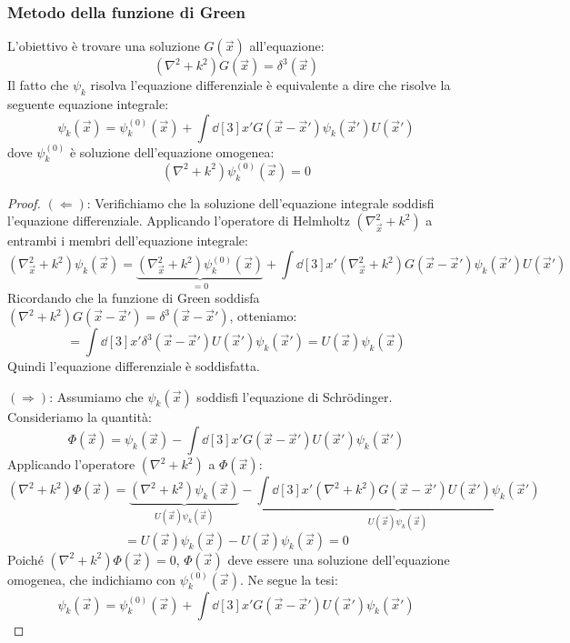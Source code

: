 \subsubsection{Metodo della funzione di Green}
L'obiettivo è trovare una soluzione \( G(\vec{x}) \) all'equazione:
\begin{equation}
    (\nabla^2 + k^2)G(\vec{x}) = \delta^3(\vec{x})
\end{equation}
Il fatto che \( \psi_k \) risolva l'equazione differenziale è equivalente a dire che risolve la seguente equazione integrale:
\begin{equation}
    \psi_k(\vec{x}) = \psi_k^{(0)}(\vec{x}) + \int \dd[3]{x'} G(\vec{x}-\vec{x}') \psi_k(\vec{x}') U(\vec{x}')
\end{equation}
dove \( \psi_k^{(0)} \) è soluzione dell'equazione omogenea:
\[
    (\nabla^2 + k^2) \psi_k^{(0)}(\vec{x}) = 0
\]
\begin{proof}
    $(\Leftarrow)$:
    Verifichiamo che la soluzione dell'equazione integrale soddisfi l'equazione differenziale. Applicando l'operatore di Helmholtz \( (\nabla_{\vec{x}}^2 + k^2) \) a entrambi i membri dell'equazione integrale:
    \[
        (\nabla_{\vec{x}}^2 + k^2) \psi_k(\vec{x}) = \underbrace{(\nabla_{\vec{x}}^2 + k^2) \psi_k^{(0)}(\vec{x})}_{=0} + \int \dd[3]{x'} (\nabla_{\vec{x}}^2 + k^2) G(\vec{x}-\vec{x}') \psi_k(\vec{x}') U(\vec{x}')
    \]
    Ricordando che la funzione di Green soddisfa \( (\nabla^2 + k^2)G(\vec{x}-\vec{x}') = \delta^3(\vec{x}-\vec{x}') \), otteniamo:
    \[
        = \int \dd[3]{x'} \delta^3(\vec{x}-\vec{x}') U(\vec{x}') \psi_k(\vec{x}') = U(\vec{x}) \psi_k(\vec{x})
    \]
    Quindi l'equazione differenziale è soddisfatta.

    $(\Rightarrow)$:
    Assumiamo che \( \psi_k(\vec{x}) \) soddisfi l'equazione di Schrödinger. Consideriamo la quantità:
    \[
        \Phi(\vec{x}) = \psi_k(\vec{x}) - \int \dd[3]{x'} G(\vec{x}-\vec{x}') U(\vec{x}') \psi_k(\vec{x}')
    \]
    Applicando l'operatore \( (\nabla^2 + k^2) \) a \( \Phi(\vec{x}) \):
    \[
        (\nabla^2 + k^2) \Phi(\vec{x}) = \underbrace{(\nabla^2 + k^2) \psi_k(\vec{x})}_{U(\vec{x})\psi_k(\vec{x})} - \underbrace{\int \dd[3]{x'} (\nabla^2 + k^2) G(\vec{x}-\vec{x}') U(\vec{x}') \psi_k(\vec{x}')}_{U(\vec{x})\psi_k(\vec{x})}
    \]
    \[
        = U(\vec{x})\psi_k(\vec{x}) - U(\vec{x})\psi_k(\vec{x}) = 0
    \]
    Poiché \( (\nabla^2 + k^2)\Phi(\vec{x}) = 0 \), \( \Phi(\vec{x}) \) deve essere una soluzione dell'equazione omogenea, che indichiamo con \( \psi_k^{(0)}(\vec{x}) \). Ne segue la tesi:
    \[
        \psi_k(\vec{x}) = \psi_k^{(0)}(\vec{x}) + \int \dd[3]{x'} G(\vec{x}-\vec{x}') U(\vec{x}') \psi_k(\vec{x}')
    \]
\end{proof}


